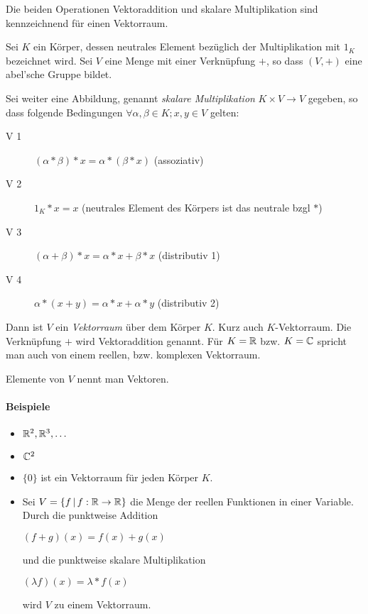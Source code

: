 Die beiden Operationen Vektoraddition und skalare Multiplikation sind kennzeichnend für einen Vektorraum.


Sei $K$ ein Körper, dessen neutrales Element bezüglich der Multiplikation mit $1_K$ bezeichnet wird. Sei $V$ eine Menge mit einer Verknüpfung $+$, so dass $(V,+)$ eine abel'sche Gruppe bildet.

Sei weiter eine Abbildung, genannt \emph{skalare Multiplikation} $K\times V\rightarrow V$ gegeben, so dass folgende Bedingungen $\forall \alpha,\beta \in K; x,y\in V$ gelten:

\begin{description}
  \item[V 1] $(\alpha*\beta)* x=\alpha*(\beta* x)$ (assoziativ)
  \item[V 2] $1_K* x = x$ (neutrales Element des Körpers ist das neutrale bzgl $*$)
  \item[V 3] $(\alpha+\beta)* x=\alpha * x + \beta* x$ (distributiv 1)
  \item[V 4] $\alpha* (x+y)=\alpha * x + \alpha* y$ (distributiv 2)
\end{description}
Dann ist $V$ ein \emph{Vektorraum} über dem Körper $K$. Kurz auch $K$-Vektorraum. Die Verknüpfung $+$ wird Vektoraddition genannt. Für $K=\mathbb{R}$ bzw. $K=\mathbb{C}$ spricht man auch von einem reellen, bzw. komplexen Vektorraum.

Elemente von $V$ nennt man Vektoren.

\paragraph{Beispiele}
\begin{multicols}{2}
  \begin{itemize}
    \item $\mathbb{R}^2, \mathbb{R}^3, \ldots$
    \item $\mathbb{C}^2$
    \item $\{0\}$ ist ein Vektorraum für jeden Körper $K$.
    \columnbreak
    \item Sei $V=\left\{ f \,\middle|\, f:\mathbb{R}\rightarrow\mathbb{R} \right\}$ die Menge der reellen Funktionen in einer Variable. Durch die punktweise Addition

    $(f+g)(x)=f(x)+g(x)$

    und die punktweise skalare Multiplikation

    $(\lambda f)(x)=\lambda* f(x)$

    wird $V$ zu einem Vektorraum.
  \end{itemize}
\end{multicols}


